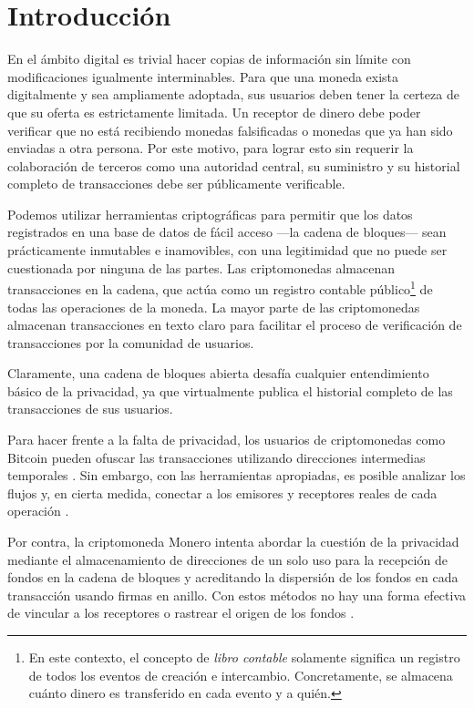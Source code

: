 \chapter{Introducción}
\label{chap:introduction}

En el ámbito digital es trivial hacer copias de información sin límite con modificaciones igualmente interminables. Para que una moneda exista digitalmente y sea ampliamente adoptada, sus usuarios deben tener la certeza de que su oferta es estrictamente limitada. Un receptor de dinero debe poder verificar que no está recibiendo monedas falsificadas o monedas que ya han sido enviadas a otra persona. Por este motivo, para lograr esto sin requerir la colaboración de terceros como una autoridad central, su suministro y su historial completo de transacciones debe ser públicamente verificable.

Podemos utilizar herramientas criptográficas para permitir que los datos registrados en una base de datos de fácil acceso ---la cadena de bloques--- sean prácticamente inmutables e inamovibles, con una legitimidad que no puede ser cuestionada por ninguna de las partes. Las criptomonedas almacenan transacciones en la cadena, que actúa como un registro contable público\footnote{En este contexto, el concepto de \textit{libro contable} solamente significa un registro de todos los eventos de creación e intercambio. Concretamente, se almacena cuánto dinero es transferido en cada evento y a quién.} de todas las operaciones de la moneda. La mayor parte de las criptomonedas almacenan transacciones en texto claro para facilitar el proceso de verificación de transacciones por la comunidad de usuarios.

Claramente, una cadena de bloques abierta desafía cualquier entendimiento básico de la privacidad, ya que virtualmente publica el historial completo de las transacciones de sus usuarios.

Para hacer frente a la falta de privacidad, los usuarios de criptomonedas como Bitcoin pueden ofuscar las transacciones utilizando direcciones intermedias temporales \cite{DBLP:journals/corr/NarayananM17}. Sin embargo, con las herramientas apropiadas, es posible analizar los flujos y, en cierta medida, conectar a los emisores y receptores reales de cada operación \cite{DBLP:journals/corr/ShenTuY15b, DK-police-tracing-btc, Andrew-Cox-Sandia}.

Por contra, la criptomoneda Monero intenta abordar la cuestión de la privacidad mediante el almacenamiento de direcciones de un solo uso para la recepción de fondos en la cadena de bloques y acreditando la dispersión de los fondos en cada transacción usando firmas en anillo. Con estos métodos no hay una forma efectiva de vincular a los receptores o rastrear el origen de los fondos \cite{Monero-intro}.

